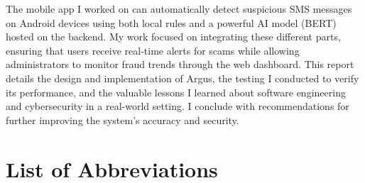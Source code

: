 \documentclass[12pt,a4paper,oneside]{report}
\begin{document}
The mobile app I worked on can automatically detect suspicious SMS messages on Android devices using both local rules and a powerful AI model (BERT) hosted on the backend. My work focused on integrating these different parts, ensuring that users receive real-time alerts for scams while allowing administrators to monitor fraud trends through the web dashboard. This report details the design and implementation of Argus, the testing I conducted to verify its performance, and the valuable lessons I learned about software engineering and cybersecurity in a real-world setting. I conclude with recommendations for further improving the system's accuracy and security.

\tableofcontents
\listoffigures
\listoftables

\chapter*{List of Abbreviations}
\printnoidxglossary[type=\acronymtype,title={List of Abbreviations}]

\clearpage
{}










\printbibliography[heading=bibintoc,title={References}]

\appendix


\end{document}
